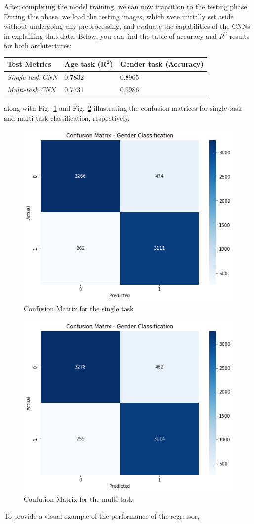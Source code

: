 After completing the model training, we can now transition to the testing
phase. During this phase, we load the testing images, which were initially
set aside without undergoing any preprocessing, and evaluate
the capabilities of the CNNs in explaining that data.
Below, you can find the table of accuracy and $R^2$ results for both
architectures:
\begin{table}[H]
    \centering
    \begin{tabular}{@{}lll@{}}
    \toprule
    Test Metrics & \textbf{Age task ($\mathbf{R^2}$)} & \textbf{Gender task (Accuracy)} \\ \midrule
    \textit{Single-task CNN} & 0.7832            & 0.8965               \\
    \textit{Multi-task CNN}  & 0.7731            & 0.8986               \\ \bottomrule
    \end{tabular}
\end{table}
along with Fig.~\ref{6mat} and Fig.~\ref{7mat} illustrating the
confusion matrices for single-task
and multi-task classification, respectively.
\begin{figure}[htbp]
    \centerline{\includegraphics[width=.4\textwidth]{images/testing/mat_single.png}}
    \caption{Confusion Matrix for the single task}
    \label{6mat}
\end{figure}
\begin{figure}[htbp]
    \centerline{\includegraphics[width=.4\textwidth]{images/testing/mat_multi.png}}
    \caption{Confusion Matrix for the multi task}
    \label{7mat}
\end{figure}
To provide a visual example of the performance of the regressor,
